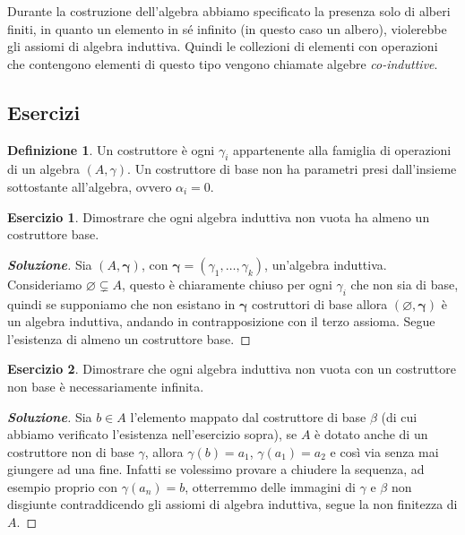 \documentclass{article}
\theoremstyle{definition}
\newtheorem{esercizio}{Esercizio}
\theoremstyle{definition}
\theoremstyle{definition}
\newtheorem{definition}[theorem]{Definizione}
\theoremstyle{remark}
\begin{document}
    Durante la costruzione dell'algebra abbiamo specificato la presenza  solo di alberi finiti, in quanto un elemento in sé infinito (in questo caso un albero), violerebbe gli assiomi di algebra induttiva. Quindi le collezioni di elementi con operazioni che contengono elementi di questo tipo
    vengono chiamate algebre \textit{co-induttive}.

    \subsection{Esercizi}
    \begin{definition}
        Un costruttore è  ogni $\gamma_i$ appartenente alla famiglia di operazioni di un algebra $(A,\gamma)$. Un costruttore di base non ha parametri presi dall'insieme sottostante all'algebra, ovvero $\alpha_i = 0$.
    \end{definition}
    \begin{esercizio}
        Dimostrare che ogni algebra induttiva non vuota ha almeno un
        costruttore base.
    \end{esercizio}
    \begin{proof}[\textbf{Soluzione}]Sia $(A,\boldsymbol{\gamma})$, con $\boldsymbol{\gamma} = (\gamma_1,\dots, \gamma_k)$, un'algebra induttiva.
        Consideriamo $\varnothing \subsetneq A$, questo è chiaramente chiuso per ogni $\gamma_i$ che non sia di base, quindi se supponiamo
        che non esistano  in $\boldsymbol{\gamma}$ costruttori di base allora $(\varnothing,\boldsymbol{\gamma})$ è un algebra induttiva, andando in
        contrapposizione con il terzo assioma. Segue l'esistenza di almeno un costruttore base.
    \end{proof}
    \begin{esercizio}
        Dimostrare che ogni algebra induttiva non vuota con un
        costruttore non base è necessariamente infinita.
    \end{esercizio}
    \begin{proof}[\textbf{Soluzione}] Sia $b\in A$  l'elemento mappato dal costruttore di base $\beta$ (di cui abbiamo
        verificato l'esistenza nell'esercizio sopra), se $A$ è dotato anche di un costruttore
        non di base $\gamma$, allora $\gamma(b) = a_1$, $\gamma(a_1) = a_2$ e così via senza mai giungere ad una fine.
        Infatti se volessimo provare a chiudere la sequenza, ad esempio proprio con $\gamma(a_n)=b$, otterremmo delle
        immagini di $\gamma$ e $\beta$ non disgiunte contraddicendo gli assiomi di algebra induttiva, segue la non finitezza di $A$.
    \end{proof}
\end{document}
